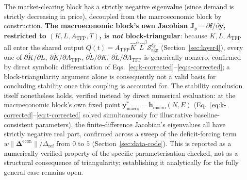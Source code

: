 \documentclass[twocolumn,10pt]{article}
\begin{document}
The market-clearing block has a strictly negative eigenvalue (since demand is strictly decreasing in price), decoupled from the macroeconomic block by construction. \textbf{The macroeconomic block's own Jacobian $\mathbf{J}_y=\partial\mathbf f/\partial\mathbf y$, restricted to $(K,L,A_{\text{TFP}},T)$, is \emph{not} block-triangular}: because $K,L,A_{\text{TFP}}$ all enter the shared output $Q(t)=A_{\text{TFP}}\hat K^\alpha\hat L^\beta\mathcal S_{\text{agg}}^{\delta_S}$ (Section~\ref{sec:layer4}), every one of $\partial\dot K/\partial L,\ \partial\dot K/\partial A_{\text{TFP}},\ \partial\dot L/\partial K,\ \partial\dot L/\partial A_{\text{TFP}}$ is generically nonzero, confirmed by direct symbolic differentiation of Eqs.~\eqref{eq:k-corrected}--\eqref{eq:a-corrected}; a block-triangularity argument alone is consequently not a valid basis for concluding stability once this coupling is accounted for. The stability conclusion itself nonetheless holds, verified instead by direct numerical evaluation: at the macroeconomic block's own fixed point $\mathbf y^*_{\text{macro}}=\mathbf h_{\text{macro}}(N,E)$ (Eq.~\eqref{eq:k-corrected}--\eqref{eq:t-corrected} solved simultaneously for illustrative baseline-consistent parameters), the finite-difference Jacobian's eigenvalues all have strictly negative real part, confirmed across a sweep of the deficit-forcing term $w\|\boldsymbol\Delta^{\text{econ}}\|/\Delta_{\text{ref}}$ from $0$ to $5$ (Section~\ref{sec:data-code}). This is reported as a numerically verified property of the specific parameterisation checked, not as a structural consequence of triangularity; establishing it analytically for the fully general case remains open.
\end{document}
